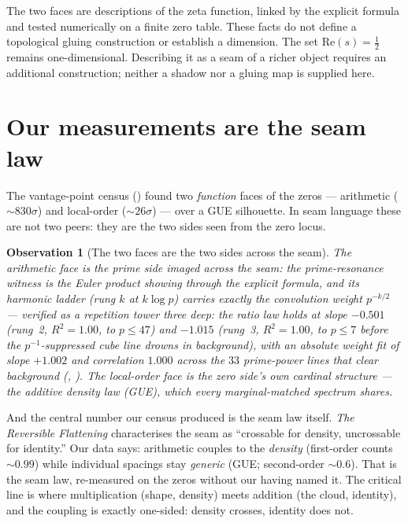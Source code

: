 \documentclass[11pt]{article}
\theoremstyle{definition}
\theoremstyle{plain}
\newtheorem{observation}{Observation}
\newcommand{\half}{\tfrac12}
\begin{document}
The two faces are descriptions of the zeta function, linked by the explicit
formula and tested numerically on a finite zero table. These facts do not
define a topological gluing construction or establish a dimension. The set
Re$(s)=\half$ remains one-dimensional. Describing it as a seam of a richer
object requires an additional construction; neither a shadow nor a gluing
map is supplied here.

\section{Our measurements are the seam law}\label{sec:seamlaw}

The vantage-point census () found two \emph{function} faces of the
zeros --- arithmetic ($\sim\!830\sigma$) and local-order ($\sim\!26\sigma$) --- over a GUE
silhouette. In seam language these are not two peers: they are the two sides seen from the zero
locus.

\begin{observation}[The two faces are the two sides across the seam]
The arithmetic face is the \emph{prime side imaged across the seam}: the prime-resonance witness
is the Euler product showing through the explicit formula, and its harmonic ladder (rung $k$ at
$k\log p$) carries exactly the convolution weight $p^{-k/2}$ --- verified as a \emph{repetition
tower three deep}: the ratio law holds at slope $-0.501$ (rung~2, $R^2\!=\!1.00$, to $p\le 47$)
and $-1.015$ (rung~3, $R^2\!=\!1.00$, to $p\le 7$ before the $p^{-1}$-suppressed cube line drowns
in background), with an absolute weight fit of slope $+1.002$ and correlation $1.000$ across the
$33$ prime-power lines that clear background (,
). The local-order face is the zero side's own \emph{cardinal}
structure --- the additive density law (GUE), which every marginal-matched spectrum shares.
\end{observation}

And the central number our census produced is the seam law itself. \textit{The Reversible
Flattening} characterises the seam as ``crossable for density, uncrossable for identity.'' Our
data says: arithmetic couples to the \emph{density} (first-order counts $\sim\!0.99$) while
individual spacings stay \emph{generic} (GUE; second-order $\sim\!0.6$). That is the seam law,
re-measured on the zeros without our having named it. The critical line is where multiplication
(shape, density) meets addition (the cloud, identity), and the coupling is exactly one-sided:
density crosses, identity does not.
\end{document}
